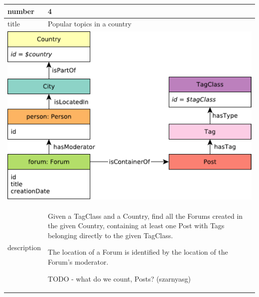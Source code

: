 \renewcommand*{\arraystretch}{1.5}
\noindent\begin{tabularx}{17cm}{|p{1.95cm}|X|}
	\hline
	number      & 4                                                          \\ \hline
	title       & Popular topics in a country                                                           \\ \hline
	\multicolumn{2}{|c|}{ \includegraphics[scale=\patternscale,margin=0cm .2cm]{patterns/q04}} \\ \hline
	description & Given a TagClass and a Country, find all the Forums created in the given
Country, containing at least one Post with Tags belonging directly to
the given TagClass.

The location of a Forum is identified by the location of the Forum's
moderator.

TODO - what do we count, Posts? (szarnyasg)
 \\ \hline
	

\end{tabularx}

